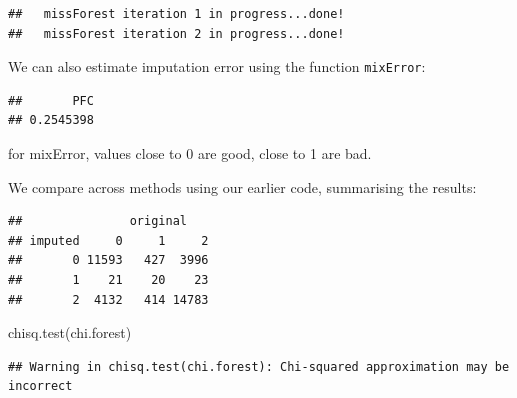 \documentclass[
]{book}
\newenvironment{Shaded}{\begin{snugshade}}{\end{snugshade}}
\newcommand{\AttributeTok}[1]{\textcolor[rgb]{0.77,0.63,0.00}{#1}}
\newcommand{\FloatTok}[1]{\textcolor[rgb]{0.00,0.00,0.81}{#1}}
\newcommand{\FunctionTok}[1]{\textcolor[rgb]{0.00,0.00,0.00}{#1}}
\newcommand{\NormalTok}[1]{#1}
\newcommand{\OtherTok}[1]{\textcolor[rgb]{0.56,0.35,0.01}{#1}}
\newcommand{\SpecialCharTok}[1]{\textcolor[rgb]{0.00,0.00,0.00}{#1}}
\newcommand{\StringTok}[1]{\textcolor[rgb]{0.31,0.60,0.02}{#1}}
\begin{document}
\begin{verbatim}
##   missForest iteration 1 in progress...done!
##   missForest iteration 2 in progress...done!
\end{verbatim}

We can also estimate imputation error using the function \texttt{mixError}:

\begin{Shaded}
\end{Shaded}

\begin{verbatim}
##       PFC 
## 0.2545398
\end{verbatim}

for mixError, values close to 0 are good, close to 1 are bad.

We compare across methods using our earlier code, summarising the results:

\begin{Shaded}
\end{Shaded}

\begin{verbatim}
##               original
## imputed     0     1     2
##       0 11593   427  3996
##       1    21    20    23
##       2  4132   414 14783
\end{verbatim}

\begin{Shaded}
\begin{Highlighting}[]
\FunctionTok{chisq.test}\NormalTok{(chi.forest) }
\end{Highlighting}
\end{Shaded}

\begin{verbatim}
## Warning in chisq.test(chi.forest): Chi-squared approximation may be incorrect
\end{verbatim}
\end{document}
